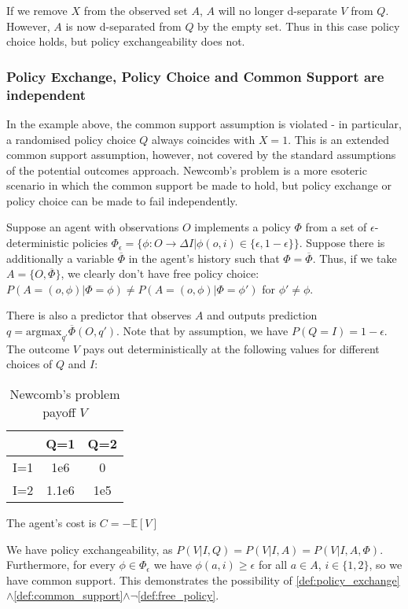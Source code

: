 If we remove $X$ from the observed set $A$, $A$ will no longer d-separate $V$ from $Q$. However, $A$ is now d-separated from $Q$ by the empty set. Thus in this case policy choice holds, but policy exchangeability does not.

\subsubsection{Policy Exchange, Policy Choice and Common Support are independent}

In the example above, the common support assumption is violated - in particular, a randomised policy choice $Q$ always coincides with $X=1$. This is an extended common support assumption, however, not covered by the standard assumptions of the potential outcomes approach. Newcomb's problem is a more esoteric scenario in which the common support be made to hold, but policy exchange or policy choice can be made to fail independently.

Suppose an agent with observations $O$ implements a policy $\Phi$ from a set of $\epsilon$-deterministic policies $\Phi_\epsilon= \{\phi:O\to\Delta I|\phi(o,i)\in\{\epsilon,1-\epsilon\}\}$. Suppose there is additionally a variable $\overline{\Phi}$ in the agent's history such that $\Phi=\overline{\Phi}$. Thus, if we take $A=\{O,\overline{\Phi}\}$, we clearly don't have free policy choice: $P(A=(o,\phi)|\Phi=\phi)\neq P(A=(o,\phi)|\Phi=\phi')$ for $\phi'\neq \phi$.

There is also a predictor that observes $A$ and outputs prediction $q=\mathrm{argmax}_{q'}\overline{\Phi}(O,q')$. Note that by assumption, we have $P(Q=I)=1-\epsilon$. The outcome $V$ pays out deterministically at the following values for different choices of $Q$ and $I$:
\begin{table}[h]
    \centering
    \begin{tabular}{c|c|c}
            & Q=1 & Q=2  \\
            \hline
        I=1 & 1e6  & 0 \\
        I=2 & 1.1e6& 1e5
    \end{tabular}
    \caption{Newcomb's problem payoff $V$}
    \label{tab:newcombs_problem}
\end{table}

The agent's cost is $C=-\mathbb{E}[V]$

We have policy exchangeability, as $P(V|I,Q)=P(V|I,A)=P(V|I,A,\Phi)$. Furthermore, for every $\phi\in\Phi_\epsilon$ we have $\phi(a,i)\geq \epsilon$ for all $a\in A$, $i\in\{1,2\}$, so we have common support. This demonstrates the possibility of \ref{def:policy_exchange}$\wedge$\ref{def:common_support}$\wedge\neg$\ref{def:free_policy}.


